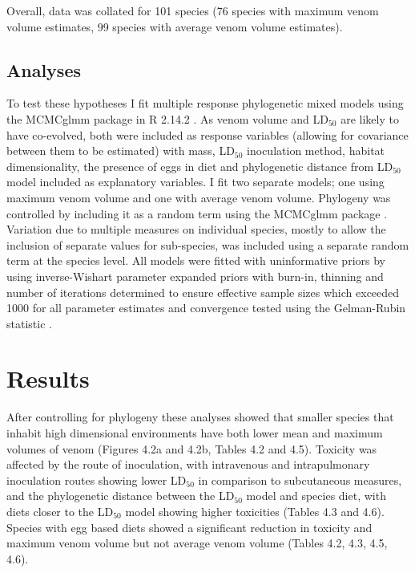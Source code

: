 Overall, data was collated for 101 species (76 species with maximum venom volume estimates, 99 species with average venom volume estimates).


\subsection{Analyses}

To test these hypotheses I fit multiple response phylogenetic mixed models using the MCMCglmm package \citep{hadfield2010mcmc} in R 2.14.2 \citep{RCran}. As venom volume and LD$_{50}$ are likely to have co-evolved, both were included as response variables (allowing for covariance between them to be estimated) with mass, LD$_{50}$ inoculation method, habitat dimensionality, the presence of eggs in diet and phylogenetic distance from LD$_{50}$ model included as explanatory variables. I fit two separate models; one using maximum venom volume and one with average venom volume. Phylogeny was controlled by including it as a random term using the MCMCglmm package \citep{hadfield2010mcmc}. Variation due to multiple measures on individual species, mostly to allow the inclusion of separate values for sub-species, was included using a separate random term at the species level. All models were fitted with uninformative priors by using inverse-Wishart parameter expanded priors \citep{hadfield2010mcmc} with burn-in, thinning and number of iterations determined to ensure effective sample sizes which exceeded 1000 for all parameter estimates and convergence tested using the Gelman-Rubin statistic \citep{gelman1992inference}. 

\section{Results}

After controlling for phylogeny these analyses showed that smaller species that inhabit high dimensional environments have both lower mean and maximum volumes of venom (Figures 4.2a and 4.2b, Tables 4.2 and 4.5). Toxicity was affected by the route of inoculation, with intravenous and intrapulmonary inoculation routes showing lower LD$_{50}$ in comparison to subcutaneous measures, and the phylogenetic distance between the LD$_{50}$ model and species diet, with diets closer to the LD$_{50}$ model showing higher toxicities (Tables 4.3 and 4.6). Species with egg based diets showed a significant reduction in toxicity and maximum venom volume but not average venom volume (Tables 4.2, 4.3, 4.5, 4.6).




